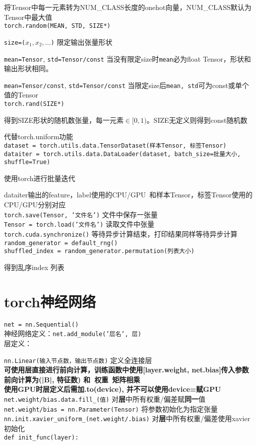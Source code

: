 \documentclass[UTF8]{ctexart}
\begin{document}
  将Tensor中每一元素转为NUM\_CLASS长度的onehot向量，NUM\_CLASS默认为Tensor中最大值\\
\texttt{torch.random(MEAN, STD, SIZE*)}

  \texttt{size=($x_1, x_2, ...$)} 限定输出张量形状

  \texttt{mean=Tensor}, \texttt{std=Tensor/const} 当没有限定size时\texttt{mean}必为float Tensor，形状和输出形状相同。

  \texttt{mean=Tensor/const}, \texttt{std=Tensor/const} 当限定size后\texttt{mean, std}可为const或单个值的Tensor\\
\texttt{torch.rand(SIZE*)}

  得到SIZE形状的随机数张量，每一元素$\in [0,1)$。SIZE无定义则得到const随机数

  代替torch.uniform功能\\
\texttt{dataset = torch.utils.data.TensorDataset(样本Tensor, 标签Tensor)}\\
\texttt{dataiter = torch.utils.data.DataLoader(dataset, batch\_size=批量大小, shuffle=True)}

  使用torch进行批量迭代
  
  dataiter输出的feature，label使用的CPU/GPU\ 和样本Tensor，标签Tensor使用的CPU/GPU分别对应\\
\texttt{torch.save(Tensor, '文件名')} 文件中保存一张量\\
\texttt{Tensor = torch.load('文件名')} 读取文件中张量\\
\texttt{torch.cuda.synchronize()} 等待异步计算结束，打印结果同样等待异步计算\\
\texttt{random\_generator = default\_rng()}\\
\texttt{shuffled\_index = random\_generator.permutation(列表大小)}

  得到乱序index 列表

\section{torch神经网络}
\noindent \texttt{net = nn.Sequential()}\\
神经网络定义：\texttt{net.add\_module('层名', 层)}\\
层定义：

  \texttt{nn.Linear(输入节点数，输出节点数)} 定义全连接层\\
\textbf{可使用层直接进行前向计算，训练函数中使用[layer.weight, net.bias]传入参数}\\
\textbf{前向计算为(|B|, 特征数) 和\ 权重\ 矩阵相乘}\\
\textbf{使用GPU时层定义后需加.to(device), 并不可以使用device=赋GPU}\\
\texttt{net.weight/bias.data.fill\_(值)} 对\textbf{层}中所有权重/偏差赋\textbf{同一}值\\
\texttt{net.weight/bias = nn.Parameter(Tensor)} 将参数初始化为指定张量\\
\texttt{nn.init.xavier\_uniform\_(net.weight/.bias)} 对\textbf{层}中所有权重/偏差使用xavier初始化\\
\texttt{def init\_func(layer):}
\end{document}
